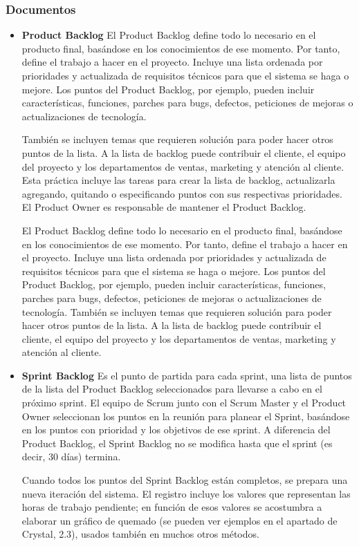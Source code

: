 \subsubsection{Documentos}
\begin{itemize}
\item \textbf{Product Backlog} El Product Backlog define todo lo necesario en el producto final, basándose en los conocimientos de ese momento. Por tanto, define el trabajo a hacer en el proyecto. Incluye una lista ordenada por prioridades y actualizada de requisitos técnicos para que el sistema se haga o mejore. Los puntos del Product Backlog, por ejemplo, pueden incluir características, funciones, parches para bugs, defectos, peticiones de mejoras o actualizaciones de tecnología.
 
También se incluyen temas que requieren solución para poder hacer otros puntos de la lista. A la lista de backlog puede contribuir el cliente, el equipo del proyecto y los departamentos de ventas, marketing y atención al cliente.
Esta práctica incluye las tareas para crear la lista de backlog, actualizarla agregando, quitando o especificando puntos con sus respectivas prioridades. El Product Owner es responsable de mantener el Product Backlog.

El Product Backlog define todo lo necesario en el producto final, basándose en los conocimientos de ese momento. Por tanto, define el trabajo a hacer en el proyecto. Incluye una lista ordenada por prioridades y actualizada de requisitos técnicos para que el sistema se haga o mejore. Los puntos del Product Backlog, por ejemplo, pueden incluir características, funciones, parches para bugs, defectos, peticiones de mejoras o actualizaciones de tecnología.
También se incluyen temas que requieren solución para poder hacer otros puntos de la lista. A la lista de backlog puede contribuir el cliente, el equipo del proyecto y los departamentos de ventas, marketing y atención al cliente.

\item \textbf{Sprint Backlog} Es el punto de partida para cada sprint, una lista de puntos de la lista del Product Backlog seleccionados para llevarse a cabo en el próximo sprint. El equipo de Scrum junto con el Scrum Master y el Product Owner seleccionan los puntos en la reunión para planear el Sprint, basándose en los puntos con prioridad y los objetivos de ese sprint. A diferencia del Product Backlog, el Sprint Backlog no se modifica hasta que el sprint (es decir, 30 días) termina.
 
Cuando todos los puntos del Sprint Backlog están completos, se prepara una nueva iteración del sistema. El registro incluye los valores que representan las horas de trabajo pendiente; en función de esos valores se acostumbra a elaborar un gráfico de quemado (se pueden ver ejemplos en el apartado de Crystal, 2.3), usados también en muchos otros métodos.
\end{itemize}
